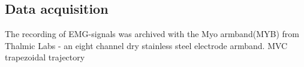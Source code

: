 \subsection{Data acquisition}
The recording of EMG-signals was archived with the Myo armband(MYB) from Thalmic Labs - an eight channel dry stainless steel electrode armband. 
MVC
trapezoidal trajectory